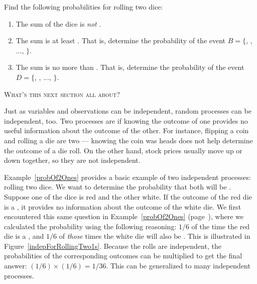 \documentclass{ccg-topic}
\begin{document}
\begin{todo}
Find the following probabilities for rolling two dice:\footnotemark
\begin{enumerate}
\setlength{\itemsep}{0mm}
\item The sum of the dice is \emph{not} . 
\item The sum is at least .
    That is, determine the probability of the event
    $B = \{$, , ..., $\}$.
\item The sum is no more than .
    That is, determine the probability of the event
    $D=\{$, , ..., $\}$.
\end{enumerate}
\end{todo}


\vspace{1em}\noindent\textsc{What's this next section all about?} 
\vspace{1em}

Just as variables and observations can be independent, random processes can be independent, too. Two processes are  if knowing the outcome of one provides no useful information about the outcome of the other. For instance, flipping a coin and rolling a die are two  --- knowing the coin was heads does not help determine the outcome of a die roll. On the other hand, stock prices usually move up or down together, so they are not independent.

Example~\ref{probOf2Ones} provides a basic example of two independent processes: rolling two dice. We want to determine the probability that both will be . Suppose one of the dice is red and the other white. If the outcome of the red die is a , it provides no information about the outcome of the white die. We first encountered this same question in Example~\ref{probOf2Ones} (page~\pageref{probOf2Ones}), where we calculated the probability using the following reasoning: $1/6$ of the time the red die is a , and $1/6$ of \emph{those} times the white die will also be . This is illustrated in Figure~\ref{indepForRollingTwo1s}. Because the rolls are independent, the probabilities of the corresponding outcomes can be multiplied to get the final answer: $(1/6)\times(1/6)=1/36$. This can be generalized to many independent processes. 
\end{document}
